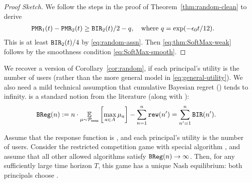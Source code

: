 \begin{proof}[Proof Sketch]
We follow the steps in the proof of Theorem~\ref{thm:random-clean} to derive \begin{align*}
\mathtt{PMR}_1(t) - \mathtt{PMR}_2(t)
    &\geq \mathtt{BIR}_2(t)/2 -q,
    \quad \text{where $q = \exp(-\epsilon_0 t/12)$.}
\end{align*}
This is at least $\mathtt{BIR}_2(t)/4$ by \eqref{eq:random-assn}. Then \eqref{eq:thm:SoftMax-weak} follows by the smoothness condition \eqref{eq:SoftMax-smooth}.
\end{proof}

\newcommand{\BReg}{\term{BReg}}

We recover a version of Corollary~\ref{cor:random}, if each principal's utility is the number of users (rather than the more general model in \eqref{eq:general-utility}). We also need a mild technical assumption that cumulative Bayesian regret (\BReg) tends to infinity. \BReg is a standard notion from the literature (along with \BIR):
\begin{align}\label{eq:SoftMax-BReg}
\BReg(n) := n\cdot \E_{\mu\sim\priorMu}
    \left[ \max_{a\in A} \mu_a\right] - \sum_{n=1}^n \rew(n')
    = \sum_{n'=1}^n \BIR(n').
\end{align}

\begin{corollary}\label{cor:SoftMax}
Assume that the response function is \SoftMaxRandom, and each principal's  utility is the number of users.
%
%
Consider the restricted competition game with special algorithm \alg, and assume that all other allowed algorithms satisfy $\BReg(n)\to \infty$. Then, for any sufficiently large time horizon $T$, this game has a unique Nash equilibrium: both principals choose \alg.
\end{corollary}

